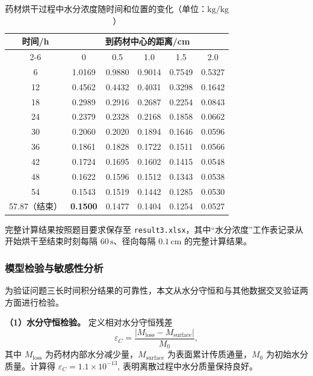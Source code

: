 \documentclass[12pt,a4paper]{article}
\begin{document}
\begin{table}[htbp]
\centering
\caption{药材烘干过程中水分浓度随时间和位置的变化（单位：\(\mathrm{kg/kg}\)）}
\label{tab:moist3}
\renewcommand{\arraystretch}{1.15}
\begin{tabular}{cccccc}
\toprule
时间/h & \multicolumn{5}{c}{到药材中心的距离/cm}\\
\cmidrule(lr){2-6}
& 0 & 0.5 & 1.0 & 1.5 & 2.0\\
\midrule
6  & 1.0169 & 0.9880 & 0.9014 & 0.7549 & 0.5327 \\
12 & 0.4562 & 0.4432 & 0.4031 & 0.3298 & 0.1642 \\
18 & 0.2989 & 0.2916 & 0.2687 & 0.2254 & 0.0843 \\
24 & 0.2379 & 0.2328 & 0.2168 & 0.1858 & 0.0662 \\
30 & 0.2060 & 0.2020 & 0.1894 & 0.1646 & 0.0596 \\
36 & 0.1861 & 0.1828 & 0.1722 & 0.1511 & 0.0566 \\
42 & 0.1724 & 0.1695 & 0.1602 & 0.1415 & 0.0548 \\
48 & 0.1622 & 0.1596 & 0.1512 & 0.1343 & 0.0538 \\
54 & 0.1543 & 0.1519 & 0.1442 & 0.1285 & 0.0530 \\
57.87（结束） & \textbf{0.1500} & 0.1477 & 0.1404 & 0.1254 & 0.0527 \\
\bottomrule
\end{tabular}
\end{table}

完整计算结果按照题目要求保存至 \texttt{result3.xlsx}，其中“水分浓度”工作表记录从开始烘干至结束时刻每隔 \(60\,\mathrm{s}\)、径向每隔 \(0.1\,\mathrm{cm}\) 的完整计算结果。

\subsubsection{模型检验与敏感性分析}

为验证问题三长时间积分结果的可靠性，本文从水分守恒和与其他数据交叉验证两方面进行检验。

\textbf{（1）水分守恒检验。} 定义相对水分守恒残差
\begin{equation}
\varepsilon_C=\frac{\left|M_{\mathrm{loss}}-M_{\mathrm{surface}}\right|}{M_0},
\end{equation}
其中 \(M_{\mathrm{loss}}\) 为药材内部水分减少量，\(M_{\mathrm{surface}}\) 为表面累计传质通量，\(M_0\) 为初始水分质量。计算得 $\varepsilon_C=1.1\times10^{-13}$,
表明离散过程中水分质量保持良好。
\end{document}
